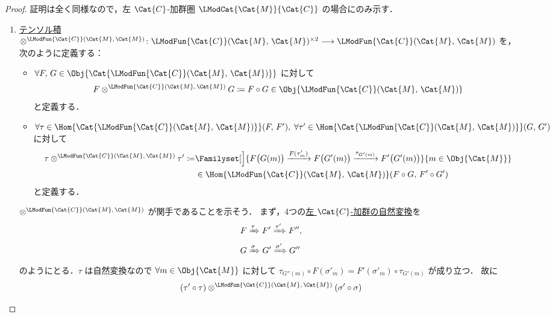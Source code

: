\documentclass[TQFT_main]{subfiles}
\begin{document}
\begin{proof}
    証明は全く同様なので，左 $\Cat{C}$-加群圏 $\LModCat{\Cat{M}}{\Cat{C}}$ の場合にのみ示す．
    \begin{enumerate}
        \item \hyperref[redef:monoidal-category]{テンソル積} $\otimes^{\LModFun{\Cat{C}}(\Cat{M},\, \Cat{M})} \colon \LModFun{\Cat{C}}(\Cat{M},\, \Cat{M})^{\times 2} \lto \LModFun{\Cat{C}}(\Cat{M},\, \Cat{M})$ を，次のように定義する：
        \begin{itemize}
            \item $\forall F,\, G \in \Obj{\Cat{\LModFun{\Cat{C}}(\Cat{M},\, \Cat{M})}}$ に対して
            \begin{align}
                F \otimes^{\LModFun{\Cat{C}}(\Cat{M},\, \Cat{M})} G \coloneqq F \circ G \in \Obj{\LModFun{\Cat{C}}(\Cat{M},\, \Cat{M})}
            \end{align}
            と定義する．
            \item $\forall \tau \in \Hom{\Cat{\LModFun{\Cat{C}}(\Cat{M},\, \Cat{M})}} (F,\, F'),\; \forall \tau' \in \Hom{\Cat{\LModFun{\Cat{C}}(\Cat{M},\, \Cat{M})}} (G,\, G')$ に対して
            \begin{align}
                \tau \otimes^{\LModFun{\Cat{C}}(\Cat{M},\, \Cat{M})} \tau' \coloneqq &\Familyset[\Big]{F\bigl(G(m)\bigr) \xrightarrow{F(\tau'_m)} F\bigl(G'(m)\bigr) \xrightarrow{\tau_{G'(m)}} F'\bigl( G'(m) \bigr)  }{m \in \Obj{\Cat{M}}} \\
                &\in \Hom{\LModFun{\Cat{C}}(\Cat{M},\, \Cat{M})} (F \circ G,\, F' \circ G')
            \end{align}
            と定義する．
        \end{itemize}
        $\otimes^{\LModFun{\Cat{C}}(\Cat{M},\, \Cat{M})}$ が関手であることを示そう．
        まず，4つの\hyperref[def:module-nat]{左 $\Cat{C}$-加群の自然変換}を
        \begin{align}
            F &\xRightarrow{\tau} F' \xRightarrow{\tau'} F'', \\
            G &\xRightarrow{\sigma} G' \xRightarrow{\sigma'} G''
        \end{align}
        のようにとる．$\tau$ は自然変換なので $\forall m \in \Obj{\Cat{M}}$ に対して $\tau_{G''(m)} \circ F(\sigma'_m) = F'(\sigma'_m) \circ \tau_{G'(m)}$ が成り立つ．
        故に
        \begin{align}
            &(\tau' \circ \tau) \otimes^{\LModFun{\Cat{C}}(\Cat{M},\, \Cat{M})} (\sigma' \circ \sigma) \\

\end{align}
\end{enumerate}
\end{proof}
\end{document}

